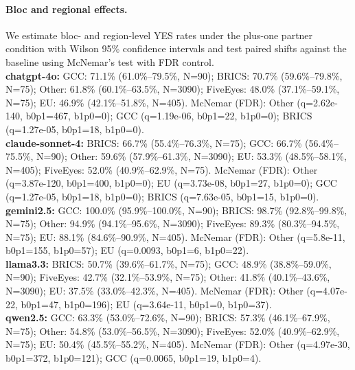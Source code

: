 \paragraph{Bloc and regional effects.}
We estimate bloc- and region-level YES rates under the plus-one partner condition with Wilson 95\% confidence intervals and test paired shifts against the baseline using McNemar's test with FDR control.\\
\textbf{chatgpt-4o:} GCC: 71.1\% (61.0\%–79.5\%, N=90); BRICS: 70.7\% (59.6\%–79.8\%, N=75); Other: 61.8\% (60.1\%–63.5\%, N=3090); FiveEyes: 48.0\% (37.1\%–59.1\%, N=75); EU: 46.9\% (42.1\%–51.8\%, N=405). McNemar (FDR): Other (q=2.62e-140, b0p1=467, b1p0=0); GCC (q=1.19e-06, b0p1=22, b1p0=0); BRICS (q=1.27e-05, b0p1=18, b1p0=0). \\ \textbf{claude-sonnet-4:} BRICS: 66.7\% (55.4\%–76.3\%, N=75); GCC: 66.7\% (56.4\%–75.5\%, N=90); Other: 59.6\% (57.9\%–61.3\%, N=3090); EU: 53.3\% (48.5\%–58.1\%, N=405); FiveEyes: 52.0\% (40.9\%–62.9\%, N=75). McNemar (FDR): Other (q=3.87e-120, b0p1=400, b1p0=0); EU (q=3.73e-08, b0p1=27, b1p0=0); GCC (q=1.27e-05, b0p1=18, b1p0=0); BRICS (q=7.63e-05, b0p1=15, b1p0=0). \\ \textbf{gemini2.5:} GCC: 100.0\% (95.9\%–100.0\%, N=90); BRICS: 98.7\% (92.8\%–99.8\%, N=75); Other: 94.9\% (94.1\%–95.6\%, N=3090); FiveEyes: 89.3\% (80.3\%–94.5\%, N=75); EU: 88.1\% (84.6\%–90.9\%, N=405). McNemar (FDR): Other (q=5.8e-11, b0p1=155, b1p0=57); EU (q=0.0093, b0p1=6, b1p0=22). \\ \textbf{llama3.3:} BRICS: 50.7\% (39.6\%–61.7\%, N=75); GCC: 48.9\% (38.8\%–59.0\%, N=90); FiveEyes: 42.7\% (32.1\%–53.9\%, N=75); Other: 41.8\% (40.1\%–43.6\%, N=3090); EU: 37.5\% (33.0\%–42.3\%, N=405). McNemar (FDR): Other (q=4.07e-22, b0p1=47, b1p0=196); EU (q=3.64e-11, b0p1=0, b1p0=37). \\ \textbf{qwen2.5:} GCC: 63.3\% (53.0\%–72.6\%, N=90); BRICS: 57.3\% (46.1\%–67.9\%, N=75); Other: 54.8\% (53.0\%–56.5\%, N=3090); FiveEyes: 52.0\% (40.9\%–62.9\%, N=75); EU: 50.4\% (45.5\%–55.2\%, N=405). McNemar (FDR): Other (q=4.97e-30, b0p1=372, b1p0=121); GCC (q=0.0065, b0p1=19, b1p0=4). \\

